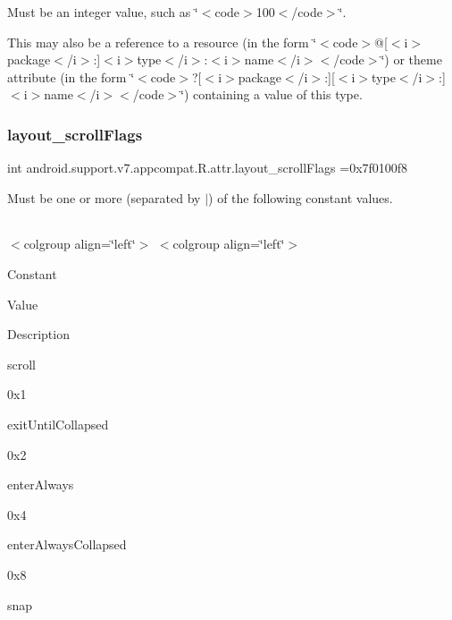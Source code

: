 Must be an integer value, such as \char`\"{}$<$code$>$100$<$/code$>$\char`\"{}. 

This may also be a reference to a resource (in the form \char`\"{}$<$code$>$@\mbox{[}$<$i$>$package$<$/i$>$\+:\mbox{]}$<$i$>$type$<$/i$>$\+:$<$i$>$name$<$/i$>$$<$/code$>$\char`\"{}) or theme attribute (in the form \char`\"{}$<$code$>$?\mbox{[}$<$i$>$package$<$/i$>$\+:\mbox{]}\mbox{[}$<$i$>$type$<$/i$>$\+:\mbox{]}$<$i$>$name$<$/i$>$$<$/code$>$\char`\"{}) containing a value of this type. \mbox{\label{classandroid_1_1support_1_1v7_1_1appcompat_1_1R_1_1attr_aa36aa8886bb09115b0225a3bd05e253d}} 
\subsubsection{\texorpdfstring{layout\+\_\+scroll\+Flags}{layout\_scrollFlags}}
{\footnotesize\ttfamily int android.\+support.\+v7.\+appcompat.\+R.\+attr.\+layout\+\_\+scroll\+Flags =0x7f0100f8\hspace{0.3cm}{\ttfamily [static]}}

Must be one or more (separated by \textquotesingle{}$\vert$\textquotesingle{}) of the following constant values.

\tabulinesep=1mm
\begin{longtabu} spread 0pt [c]{*{0}{|X[-1]}|}
\hline
\end{longtabu}
$<$colgroup align=\char`\"{}left\char`\"{}$>$ $<$colgroup align=\char`\"{}left\char`\"{}$>$ 

Constant

Value

Description 

{\ttfamily scroll}

0x1

{\ttfamily exit\+Until\+Collapsed}

0x2

{\ttfamily enter\+Always}

0x4

{\ttfamily enter\+Always\+Collapsed}

0x8

{\ttfamily snap}


